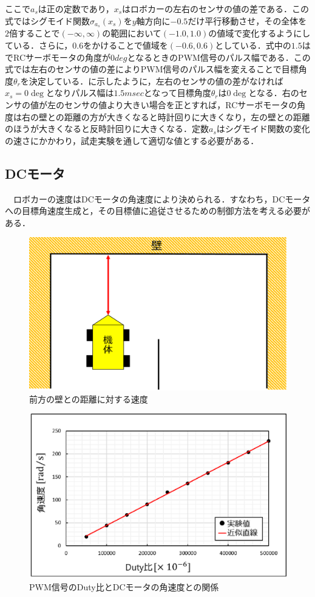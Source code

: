 ここで$ a_{s}$は正の定数であり，$ x_{s}$はロボカーの左右のセンサの値の差である．この式ではシグモイド関数$\sigma_{a_{s}}(x_{s}) $を$y$軸方向に$-0.5$だけ平行移動させ，その全体を$2$倍することで$(-\infty,\infty)$の範囲において$(-1.0,1.0)$の値域で変化するようにしている．さらに，$0.6$をかけることで値域を$(-0.6,0.6)$としている．式中の$1.5$はでRCサーボモータの角度が$0\unit{deg}$となるときのPWM信号のパルス幅である．この式では左右のセンサの値の差によりPWM信号のパルス幅を変えることで目標角度$\theta_{r} $を決定している．に示したように，左右のセンサの値の差がなければ$x_{s}=0\unit{\deg}$となりパルス幅は$1.5\unit{msec}$となって目標角度$\theta_{r}$は$0\unit{\deg}$となる．右のセンサの値が左のセンサの値より大きい場合を正とすれば，RCサーボモータの角度は右の壁との距離の方が大きくなると時計回りに大きくなり，左の壁との距離のほうが大きくなると反時計回りに大きくなる．定数$a_{s}$はシグモイド関数の変化の速さにかかわり，試走実験を通して適切な値とする必要がある．

\subsection{DCモータ}
　ロボカーの速度はDCモータの角速度により決められる．すなわち，DCモータへの目標角速度生成と，その目標値に追従させるための制御方法を考える必要がある．

 \begin{figure}[htb]

  \centering
    \includegraphics[width=0.6\hsize]{picture/eps/speed_wall.eps}
  \caption{前方の壁との距離に対する速度}
  \label{fig::speed_wall}
\end{figure}

\begin{figure}[htb]
  \centering
    \includegraphics[width=0.7\hsize]{picture/eps/duty_angvel_graph.eps}
  \caption{PWM信号のDuty比とDCモータの角速度との関係}
  \label{fig::duty_angvel_graph}
\end{figure}

